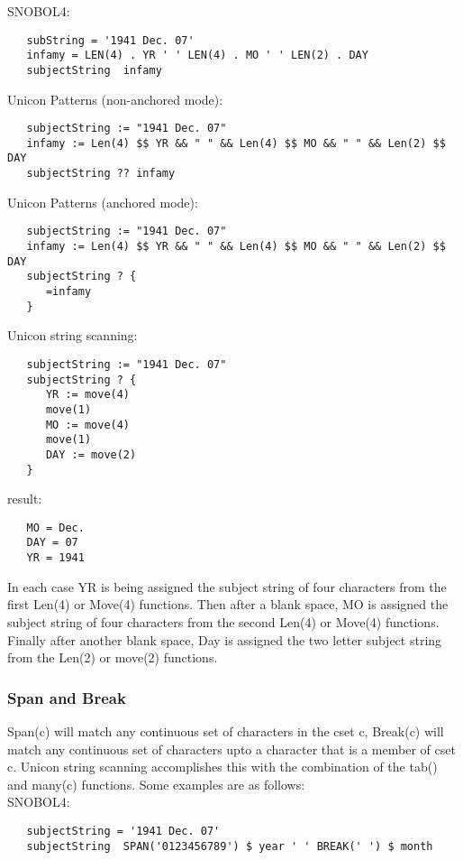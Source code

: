 \documentclass{article}
\begin{document}
\noindent
SNOBOL4:
\begin{verbatim}
   subString = '1941 Dec. 07' 
   infamy = LEN(4) . YR ' ' LEN(4) . MO ' ' LEN(2) . DAY 
   subjectString  infamy 
\end{verbatim}

\noindent
Unicon Patterns (non-anchored mode):
\begin{verbatim}
   subjectString := "1941 Dec. 07"
   infamy := Len(4) $$ YR && " " && Len(4) $$ MO && " " && Len(2) $$ DAY 
   subjectString ?? infamy
\end{verbatim}
\noindent
Unicon Patterns (anchored mode):
\begin{verbatim}
   subjectString := "1941 Dec. 07"
   infamy := Len(4) $$ YR && " " && Len(4) $$ MO && " " && Len(2) $$ DAY 
   subjectString ? {
      =infamy
   }
\end{verbatim}

\noindent
Unicon string scanning:
\begin{verbatim}
   subjectString := "1941 Dec. 07"
   subjectString ? {
      YR := move(4)
      move(1)
      MO := move(4)
      move(1)
      DAY := move(2)
   }
\end{verbatim}

\noindent
result:
\begin{verbatim}
   MO = Dec.
   DAY = 07
   YR = 1941
\end{verbatim}

In each case YR is being assigned the subject string of four characters from the first Len(4) or Move(4) functions.  Then after a blank space, MO is assigned the subject string of four characters from the second Len(4) or Move(4) functions.  Finally after another blank space, Day is assigned the two letter subject string from the Len(2) or move(2) functions.

\vspace{2 pc}
\subsubsection{Span and Break}
Span(c) will match any continuous set of characters in the cset c, Break(c) will match any continuous set of characters upto a character that is a member of cset c.  Unicon string scanning accomplishes this with the combination of the tab() and many(c) functions. Some examples are as follows: \\

\noindent
SNOBOL4:
\begin{verbatim}
   subjectString = '1941 Dec. 07'
   subjectString  SPAN('0123456789') $ year ' ' BREAK(' ') $ month
\end{verbatim}
\end{document}
